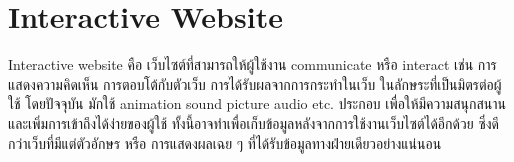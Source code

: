 \section{Interactive Website}
Interactive website \cite{interactive-web} คือ เว็บไซต์ที่สามารถให้ผู้ใช้งาน communicate หรือ interact เช่น การแสดงความคิดเห็น การตอบโต้กับตัวเว็บ 
การได้รับผลจากการกระทําในเว็บ ในลักษระที่เป็นมิตรต่อผู้ใช้ โดยปัจจุบัน มักใช้ animation sound picture audio etc. ประกอบ 
เพื่อให้มีความสนุกสนานและเพิ่มการเข้าถึงได้ง่ายของผู้ใช้ ทั้งนี้อาจทําเพื่อเก็บข้อมูลหลังจากการใช้งานเว็บไซต์ได้อีกด้วย ซึ่งดีกว่าเว็บที่มีแต่ตัวอักษร หรือ 
การแสดงผลเฉย ๆ ที่ได้รับข้อมูลทางฝ่ายเดียวอย่างแน่นอน







